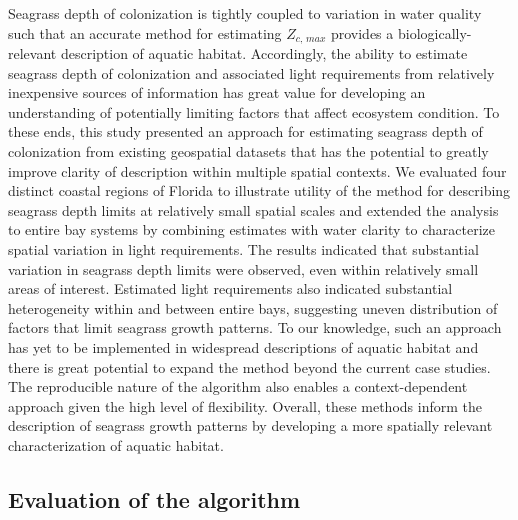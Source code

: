 \documentclass[letterpaper,12pt,oneside]{article}\usepackage[]{graphicx}\usepackage[]{color}
\begin{document}
Seagrass depth of colonization is tightly coupled to variation in water quality such that an accurate method for estimating $Z_{c,\,max}$ provides a biologically-relevant description of aquatic habitat.  Accordingly, the ability to estimate seagrass depth of colonization and associated light requirements from relatively inexpensive sources of information has great value for developing an understanding of potentially limiting factors that affect ecosystem condition.  To these ends, this study presented an approach for estimating seagrass depth of colonization from existing geospatial datasets that has the potential to greatly improve clarity of description within multiple spatial contexts.  We evaluated four distinct coastal regions of Florida to illustrate utility of the method for describing seagrass depth limits at relatively small spatial scales and extended the analysis to entire bay systems by combining estimates with water clarity to characterize spatial variation in light requirements.  The results indicated that substantial variation in seagrass depth limits were observed, even within relatively small areas of interest.  Estimated light requirements also indicated substantial heterogeneity within and between entire bays, suggesting uneven distribution of factors that limit seagrass growth patterns.  To our knowledge, such an approach has yet to be implemented in widespread descriptions of aquatic habitat and there is great potential to expand the method beyond the current case studies.  The reproducible nature of the algorithm also enables a context-dependent approach given the high level of flexibility.  Overall, these methods inform the description of seagrass growth patterns by developing a more spatially relevant characterization of aquatic habitat.

\subsection{Evaluation of the algorithm}
\end{document}
